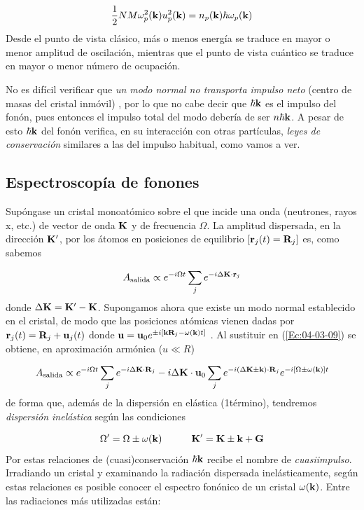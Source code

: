 \begin{equation}
    \frac{1}{2} N M \omega_p^2 (\mathbf{k}) u_p^2 (\mathbf{k}) = n_p (\mathbf{k}) \hbar \omega_p (\mathbf{k})
\end{equation}
Desde el punto de vista clásico, más o menos energía se traduce en mayor o menor amplitud de oscilación, mientras que el punto de vista cuántico se traduce en mayor o menor número de ocupación. 

No es difícil verificar que \textit{un modo normal no transporta impulso neto} (centro de masas del cristal inmóvil) , por lo que no cabe decir que $\hbar \mathbf{k}$ es el impulso del fonón, pues entonces el impulso total del modo debería de ser $n \hbar \mathbf{k}$. A pesar de esto $\hbar \mathbf{k}$ del fonón verifica, en su interacción con otras partículas, \textit{leyes de conservación} similares a las del impulso habitual, como vamos a ver.

\subsection{Espectroscopía de fonones}

Supóngase un cristal monoatómico sobre el que incide una onda (neutrones, rayos x, etc.) de vector de onda $\mathbf{K}$ y de frecuencia $\Omega$. La amplitud dispersada, en la dirección $\mathbf{K}'$, por los átomos en posiciones de equilibrio $[\mathbf{r}_j (t)= \mathbf{R}_j]$ es, como sabemos

\begin{equation}
    A_{\text{salida}} \propto e^{-i \Omega t } \sum_j e^{-i \Delta \mathbf{K} \cdot \mathbf{r}_j} \label{Ec:04-03-09}
\end{equation}
donde $\Delta \mathbf{K} = \mathbf{K} ' - \mathbf{K}$. Supongamos ahora que existe un modo normal establecido en el cristal, de modo que las posiciones atómicas vienen dadas por $\mathbf{r}_j(t) = \mathbf{R}_j + \mathbf{u}_j (t)$ donde $\mathbf{u}=\mathbf{u}_0  e^{\pm i \left[ \mathbf{k} \mathbf{R}_j -  \omega (\mathbf{k})t \right]}$ . Al sustituir en (\ref{Ec:04-03-09}) se obtiene, en aproximación armónica ($u \ll R$) 

\begin{equation}
    A_{\text{salida}} \propto e^{-i\Omega t} \sum_j e^{-i\Delta \mathbf{K} \cdot \mathbf{R}_j} - i \Delta \mathbf{K} \cdot \mathbf{u}_0 \sum_j e^{- i (\Delta \mathbf{K} \pm \mathbf{k}) \cdot \mathbf{R}_j} e^{- i \left[ \Omega \pm \omega (\mathbf{k}) \right]t}
\end{equation}
de forma que, además de la dispersión en elástica (1\er término), tendremos \textit{dispersión inelástica} según las condiciones 

\begin{equation}
    \Omega' = \Omega \pm \omega (\mathbf{k}) \quad \quad \quad \mathbf{K}' = \mathbf{K} \pm \mathbf{k} + \mathbf{G}
\end{equation}
Por estas relaciones de (cuasi)conservación $\hbar \mathbf{k}$ recibe el nombre de \textit{cuasiimpulso}. Irradiando un cristal y examinando la radiación dispersada inelásticamente, según estas relaciones es posible conocer el espectro fonónico de un cristal $\omega (\mathbf{k})$. Entre las radiaciones más utilizadas están:

